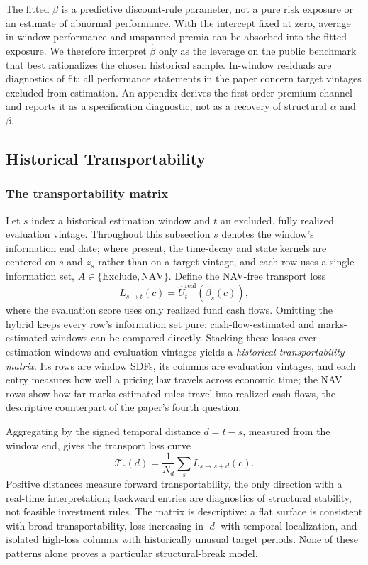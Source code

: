 \documentclass[11pt]{article}
\begin{document}
The fitted $\beta$ is a predictive discount-rule parameter, not a pure risk
exposure or an estimate of abnormal performance. With the intercept fixed at
zero, average in-window performance and unspanned premia can be absorbed into
the fitted exposure. We therefore interpret $\widehat\beta$ only as the
leverage on the public benchmark that best rationalizes the chosen historical
sample. In-window residuals are diagnostics of fit; all performance statements
in the paper concern target vintages excluded from estimation. An appendix
derives the first-order premium channel and reports it as a specification
diagnostic, not as a recovery of structural $\alpha$ and $\beta$.

\subsection{Historical Transportability}

\subsubsection{The transportability matrix}

Let $s$ index a historical estimation window and $t$ an excluded, fully
realized evaluation vintage. Throughout this subsection $s$ denotes the
window's information end date; where present, the time-decay and state
kernels are centered on $s$ and $z_s$ rather than on a target vintage, and
each row uses a single information set,
$A\in\{\mathrm{Exclude},\mathrm{NAV}\}$. Define the NAV-free transport loss
\[
L_{s\rightarrow t}(c)
=
\widehat U_t^{\mathrm{real}}\!\left(
  \widehat\beta_s(c)
\right),
\]
where the evaluation score uses only realized fund cash flows. Omitting the
hybrid keeps every row's information set pure: cash-flow-estimated and
marks-estimated windows can be compared directly. Stacking these losses over
estimation windows and evaluation vintages yields a
\emph{historical transportability matrix}. Its rows are window SDFs, its
columns are evaluation vintages, and each entry measures how well a pricing
law travels across economic time; the NAV rows show how far marks-estimated
rules travel into realized cash flows, the descriptive counterpart of the
paper's fourth question.

Aggregating by the signed temporal distance $d=t-s$, measured from the window
end, gives the transport loss curve
\[
\mathcal T_c(d)
=
\frac{1}{N_d}\sum_s L_{s\rightarrow s+d}(c).
\]
Positive distances measure forward transportability, the only direction with
a real-time interpretation; backward entries are diagnostics of structural
stability, not feasible investment rules. The matrix is descriptive: a flat
surface is consistent with broad transportability, loss increasing in $|d|$
with temporal localization, and isolated high-loss columns with historically
unusual target periods. None of these patterns alone proves a particular
structural-break model.
\end{document}
